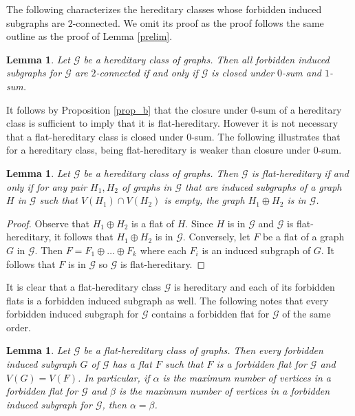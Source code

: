 \documentclass[11pt]{amsart}
\newtheorem{lemma}[theorem]{Lemma}
\theoremstyle{definition}
\theoremstyle{remark}
\numberwithin{equation}{section}
\begin{document}
The following characterizes the hereditary classes whose forbidden induced subgraphs are $2$-connected. We omit its proof as the proof follows the same outline as the proof of Lemma \ref{prelim}.

\begin{lemma}
\label{prelim_stronger}
Let $\mathcal{G}$ be a hereditary class of graphs. Then all forbidden induced subgraphs for $\mathcal{G}$ are $2$-connected if and only if $\mathcal{G}$ is closed under $0$-sum and $1$-sum.
\end{lemma}




It follows by Proposition \ref{prop_b} that the closure under $0$-sum of a hereditary class is sufficient to imply that it is flat-hereditary. However it is not necessary that a flat-hereditary class is closed under $0$-sum. The following illustrates that for a hereditary class, being flat-hereditary is weaker than closure under $0$-sum.




\begin{lemma}
\label{characterization_flat_hereditary}
Let $\mathcal{G}$ be a hereditary class of graphs. Then $\mathcal{G}$ is flat-hereditary if and only if for any pair $H_1, H_2$ of graphs in $\mathcal{G}$ that are induced subgraphs of a graph $H$ in $\mathcal{G}$ such that $V(H_1) \cap V(H_2)$ is empty, the graph $H_1 \oplus H_2$ is in $\mathcal{G}$. 
\end{lemma}

\begin{proof}
 Observe that $H_1 \oplus H_2$ is a flat of $H$. Since $H$ is in $\mathcal{G}$ and $\mathcal{G}$ is flat-hereditary, it follows that $H_1 \oplus H_2$ is in $\mathcal{G}$. Conversely, let $F$ be a flat of a graph $G$ in $\mathcal{G}$. Then $F = F_1 \oplus \ldots \oplus F_k$ where each $F_i$ is an induced subgraph of $G$. It follows that $F$ is in $\mathcal{G}$ so $\mathcal{G}$ is flat-hereditary.   
\end{proof}


It is clear that a flat-hereditary class $\mathcal{G}$ is hereditary and each of its forbidden flats is a forbidden induced subgraph as well. The following notes that every forbidden induced subgraph for $\mathcal{G}$ contains a forbidden flat for $\mathcal{G}$ of the same order.


\begin{lemma}
\label{flat_fis}
Let $\mathcal{G}$ be a flat-hereditary class of graphs. Then every forbidden induced subgraph $G$ of $\mathcal{G}$ has a flat $F$ such that $F$ is a forbidden flat for $\mathcal{G}$ and $V(G) = V(F)$. In particular, if $\alpha$ is the maximum number of vertices in a forbidden flat for $\mathcal{G}$ and $\beta$ is the maximum number of vertices in a forbidden induced subgraph for $\mathcal{G}$, then $\alpha = \beta$.
\end{lemma}
\end{document}
